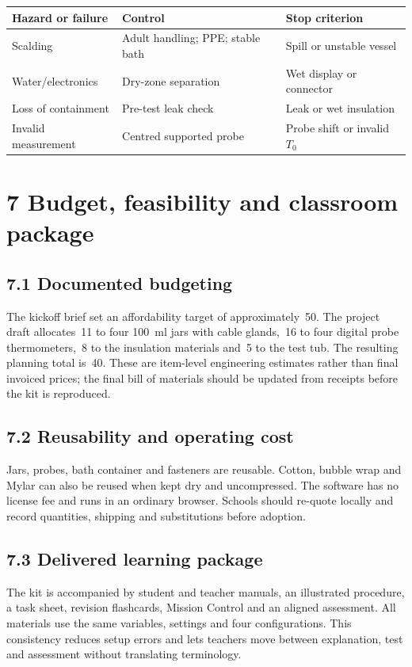 \documentclass[9pt,a4paper]{extarticle}
\newcommand{\EUR}[1]{\texteuro\,#1}
\begin{document}
\begin{center}\small
\begin{tabularx}{\columnwidth}{|>{\raggedright\arraybackslash}X|>{\raggedright\arraybackslash}X|>{\raggedright\arraybackslash}X|}\hline
\textbf{Hazard or failure} & \textbf{Control} & \textbf{Stop criterion} \\ \hline
Scalding & Adult handling; PPE; stable bath & Spill or unstable vessel \\ \hline
Water/electronics & Dry-zone separation & Wet display or connector \\ \hline
Loss of containment & Pre-test leak check & Leak or wet insulation \\ \hline
Invalid measurement & Centred supported probe & Probe shift or invalid $T_0$ \\ \hline
\end{tabularx}
\end{center}
\section*{7 Budget, feasibility and classroom package}
\subsection*{7.1 Documented budgeting}
The kickoff brief set an affordability target of approximately \EUR{50}. The project draft allocates \EUR{11} to four \SI{100}{\milli\litre} jars with cable glands, \EUR{16} to four digital probe thermometers, \EUR{8} to the insulation materials and \EUR{5} to the test tub. The resulting planning total is \EUR{40}. These are item-level engineering estimates rather than final invoiced prices; the final bill of materials should be updated from receipts before the kit is reproduced.

\subsection*{7.2 Reusability and operating cost}
Jars, probes, bath container and fasteners are reusable. Cotton, bubble wrap and Mylar can also be reused when kept dry and uncompressed. The software has no license fee and runs in an ordinary browser. Schools should re-quote locally and record quantities, shipping and substitutions before adoption.

\subsection*{7.3 Delivered learning package}
The kit is accompanied by student and teacher manuals, an illustrated procedure, a task sheet, revision flashcards, Mission Control and an aligned assessment. All materials use the same variables, settings and four configurations. This consistency reduces setup errors and lets teachers move between explanation, test and assessment without translating terminology.
\end{document}
